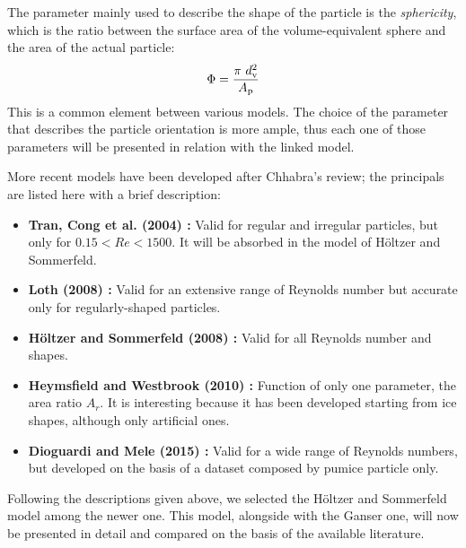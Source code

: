 	The parameter mainly used to describe the shape of the particle is the \textit{sphericity}, which is the ratio between the surface area of the
	volume-equivalent sphere and the area of the actual particle:
	\begin{equation}
		\Phi = \dfrac{\pi \ d_{\textup{v}}^2} {A_{\textup{p}}}
		\label{eq: sphericity}
	\end{equation}
	This is a common element between various models. The choice of the parameter that describes the particle orientation is more ample, thus each one of those parameters will be presented in relation with the linked model.
	
	More recent models have been developed after Chhabra's review; the principals are listed here with a brief description:
	\begin{itemize}
		\item \textbf{Tran, Cong et al. (2004) \cite{TranCongEtAl-2004}:} Valid for regular and irregular particles, but only for $ 0.15 < Re < 1500 $. It will be absorbed in the model of H\"oltzer and Sommerfeld.
		
		\item \textbf{Loth (2008) \cite{Loth-2008}:} Valid for an extensive range of Reynolds number but accurate only for regularly-shaped particles.
		
		\item \textbf{H\"oltzer and Sommerfeld (2008) \cite{HoltzerSommerfeld-2008}:} Valid for all Reynolds number and shapes.

		\item \textbf{Heymsfield and Westbrook (2010) \cite{HeymsfieldWestbrook-2010}:} Function of only one parameter, the area ratio $ A_r $. It is interesting because it has been developed starting from ice shapes, although only artificial ones.
		
		\item \textbf{Dioguardi and Mele (2015) \cite{DioguardiMele-2015}:} Valid for a wide range of Reynolds numbers, but developed on the basis of a dataset composed by pumice particle only.
	\end{itemize}
	
	Following the descriptions given above, we selected the H\"oltzer and Sommerfeld model among the newer one. This model, alongside with the Ganser one, will now be presented in detail and compared on the basis of the available literature.

		
